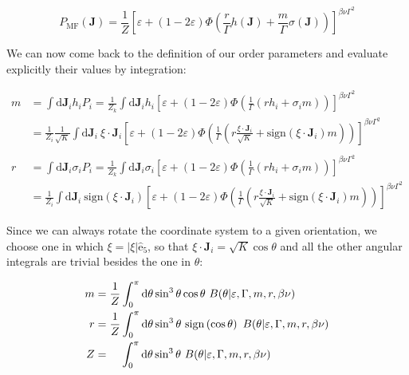\documentclass[12pt,a4paperpaper,]{tufte-book}
\begin{document}
\begin{equation} P_{\mathrm{MF}}(\mathbf{J}) = \frac{1}{Z} \left[ \varepsilon + \left(1 - 2\varepsilon\right) \Phi \left( \frac{r}\Gamma h (\mathbf{J}) + \frac{m}{\Gamma}\sigma (\mathbf{J}) \right) \right]^{\beta \nu \Gamma^2} \label{eq:meanfieldfinal}\end{equation}

We can now come back to the definition of our order parameters and evaluate explicitly their values by integration:

\begin{align}
     m &= \int \mathrm{d}\mathbf{J}_i h_i P_i = \frac{1}{Z_k} \int \mathrm{d}\mathbf{J}_i h_i \left[ \varepsilon + \left(1 - 2\varepsilon\right)  \Phi \left( \frac1\Gamma \left( r h_i + \sigma_i m \right) \right) \right]^{\beta \nu \Gamma^2} \\
    &= \frac{1}{Z_i} \frac{1}{\sqrt{K}} \int \mathrm{d}\mathbf{J}_i\ \xi \cdot \mathbf{J}_i \left[ \varepsilon + \left(1 - 2\varepsilon\right)  \Phi \left( \frac1\Gamma \left( r \frac{\xi \cdot \mathbf{J}_i}{\sqrt{K}} + \mathrm{sign} \left( \xi \cdot \mathbf{J}_i \right)  m \right) \right) \right]^{\beta \nu \Gamma^2} \\ \\
     r &= \int \mathrm{d}\mathbf{J}_i \sigma_i P_i = \frac{1}{Z_k} \int \mathrm{d}\mathbf{J}_i \sigma_i \left[ \varepsilon + \left(1 - 2\varepsilon\right)  \Phi \left( \frac1\Gamma \left( r h_i + \sigma_i m \right) \right) \right]^{\beta \nu \Gamma^2} \\
    &= \frac{1}{Z_i} \int \mathrm{d}\mathbf{J}_i\ \mathrm{sign} \left( \xi \cdot \mathbf{J}_i \right) \left[ \varepsilon + \left(1 - 2\varepsilon\right)  \Phi \left( \frac1\Gamma \left( r \frac{\xi \cdot \mathbf{J}_i}{\sqrt{K}} + \mathrm{sign} \left( \xi \cdot \mathbf{J}_i \right)  m \right) \right) \right]^{\beta \nu \Gamma^2}
\end{align}

Since we can always rotate the coordinate system to a given orientation, we choose one in which \(\xi = |\xi| \hat{\mathrm{e}}_5\), so that \(\xi \cdot \mathbf{J}_i = \sqrt{K} \cos\theta\) and all the other angular integrals are trivial besides the one in \(\theta\):

\begin{align}
    m &= \frac{1}{Z} \int_0^\pi \mathrm{d}\theta \sin^3 \theta \cos\theta\ B(\theta| \varepsilon, \Gamma, m, r, \beta\nu)  \\
    r &= \frac{1}{Z} \int_0^\pi \mathrm{d}\theta \sin^3 \theta\ \mathrm{sign} \left( \cos\theta \right)\ B(\theta| \varepsilon, \Gamma, m, r, \beta\nu) \\
    Z &= \hspace{4mm}\int_0^\pi \mathrm{d}\theta \sin^3 \theta\ B(\theta| \varepsilon, \Gamma, m, r, \beta\nu)
\end{align}
\end{document}

